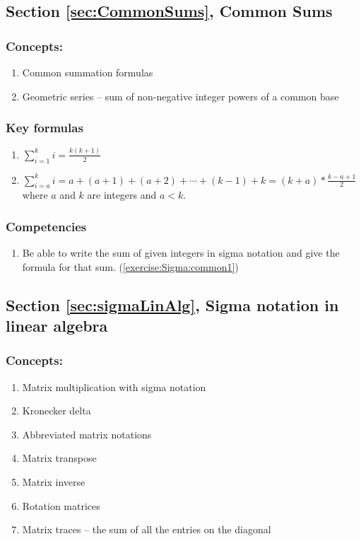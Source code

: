 \subsection*{Section \ref{sec:CommonSums}, Common Sums}
\subsubsection*{Concepts:}
\begin{enumerate}
\item 
Common summation formulas
\item
Geometric series -- sum of non-negative integer powers of a common base
\end{enumerate}

\subsubsection*{Key formulas}
\begin{enumerate}
\item
$\displaystyle{\sum_{i = 1}^{k}i= \frac{k(k + 1)}{2}}$
\item
$\displaystyle{\sum_{i = a}^{k}i} = a + (a + 1) + (a + 2) + \cdots + (k - 1) + k = (k + a) * \frac{k - a + 1}{2}$ where $a$ and $k$ are integers and $a<k$.
\end{enumerate}

\subsubsection*{Competencies}
\begin{enumerate}
\item
Be able to write the sum of given integers in sigma notation and give the formula for that sum. (\ref{exercise:Sigma:common1})
\end{enumerate}


\subsection*{Section \ref{sec:sigmaLinAlg}, Sigma notation in linear algebra}
\subsubsection*{Concepts:}
\begin{enumerate}
\item 
Matrix multiplication with sigma notation
\item
Kronecker delta
\item
Abbreviated matrix notations
\item
Matrix transpose
\item
Matrix inverse
\item
Rotation matrices
\item
Matrix traces -- the sum of all the entries on the diagonal
\end{enumerate}

